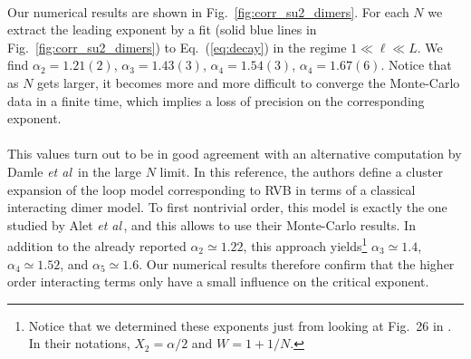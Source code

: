 \documentclass[11pt]{iopart}
\begin{document}
\paragraph{}Our numerical results are shown in Fig.~\ref{fig:corr_su2_dimers}. For each $N$ we extract the leading exponent by a fit (solid blue lines in Fig.~\ref{fig:corr_su2_dimers}) to Eq.~(\ref{eq:decay}) in the regime $1\ll \ell \ll L$. We find $\alpha_2=1.21(2)$, $\alpha_3=1.43(3)$, $\alpha_4=1.54(3)$, $\alpha_4=1.67(6)$. Notice that as $N$ gets larger, it becomes more and more difficult  to converge the Monte-Carlo data in a finite time, which implies a loss of precision on the corresponding exponent. 
\paragraph{}This values turn out to be in good agreement with an alternative computation by Damle {\it et al}\,\cite{Damle} in the large $N$ limit. In this reference, the authors define a cluster expansion of the loop model corresponding to RVB in terms of a classical interacting dimer model. To first nontrivial order, this model is exactly the one studied by Alet {\it et al}\,\cite{Alet_dimers1,Alet_dimers2}, and this allows to use their Monte-Carlo results. In addition to the already reported $\alpha_2\simeq 1.22$, this approach yields\footnote{Notice that we determined these exponents just from looking at Fig.~26 in \cite{Alet_dimers2}. In their notations,  $X_2=\alpha/2$ and $W=1+1/N$.} $\alpha_3 \simeq 1.4$, $\alpha_4 \simeq 1.52$, and $\alpha_5\simeq 1.6$. Our numerical results therefore confirm that the higher order interacting terms only have a small influence on the critical exponent. 
\end{document}
